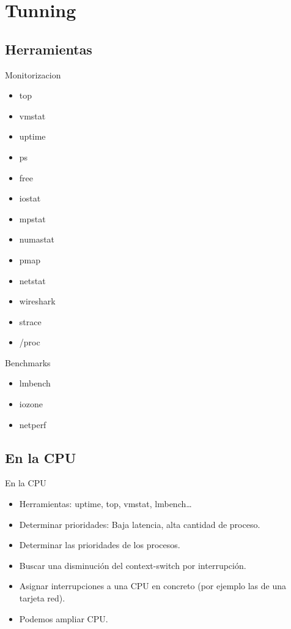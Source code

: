 \section{Tunning}
\subsection{Herramientas}

\begin{frame}{Monitorizacion}
	\begin{itemize}
		\item top
		\item vmstat
		\item uptime
		\item ps
		\item free
		\item iostat
		\item mpstat
		\item numastat
		\item pmap
		\item netstat
		\item wireshark
		\item strace
		\item /proc
	\end{itemize}
\end{frame}

\begin{frame}{Benchmarks}
	\begin{itemize}
		\item lmbench
		\item iozone
		\item netperf
	\end{itemize}
\end{frame}

\subsection{En la CPU}
\begin{frame}{En la CPU}
	\begin{itemize}
		\item Herramientas: uptime, top, vmstat, lmbench\dots
		\item Determinar prioridades: Baja latencia, alta cantidad de proceso.
		\item Determinar las prioridades de los procesos.
		\item Buscar una disminución del context-switch por interrupción.
		\item Asignar interrupciones a una CPU en concreto (por ejemplo las de una tarjeta red).
		\item Podemos ampliar CPU.
	\end{itemize}
\end{frame}

